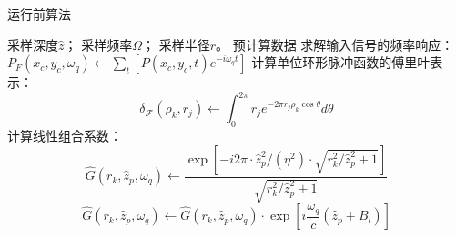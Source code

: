 \documentclass[master]{shtthesis}             %
\begin{document}
\begin{algorithm}[!t]
    \caption{运行前算法}
    \label{algo:b_rt}
    \begin{algorithmic}[1] %
        \Require 采样深度$\hat{z}$； 采样频率$\Omega$； 采样半径$r$。
        \Ensure 预计算数据%
        \State 求解输入信号的频率响应：
            \State $ P_F(x_c, y_c, \omega_q) \gets \sum_t[P(x_c, y_c, t)e^{-i\omega_q t}] $
        \EndFor
        \State 计算单位环形脉冲函数的傅里叶表示：
                \State $$ \delta_{\mathcal{F}}(\rho_k, r_j) \gets \int_0^{2\pi}r_je^{-2\pi r_j \rho_k \cos \theta} d\theta $$
            \EndFor
        \EndFor
        \State 计算线性组合系数：
                    \State $$\hat{G}(r_k, \hat{z}_p, \omega_q) \gets \frac{\exp{\left[-i2\pi\cdot\hat{z}_p^2/(\eta^2)\cdot\sqrt{r_k^2/\hat{z}_p^2+1}\right]}}{\sqrt{r_k^2/\hat{z}_p^2+1}}$$
                    \State $$ \hat{G}(r_k, \hat{z}_p, \omega_q) \gets \hat{G}(r_k, \hat{z}_p, \omega_q) \cdot \exp\left[i\frac{\omega_q}{c}(\hat{z}_p+B_l)\right] $$
                \EndFor
            \EndFor
        \EndFor
    \end{algorithmic}
\end{algorithm}
\end{document}
